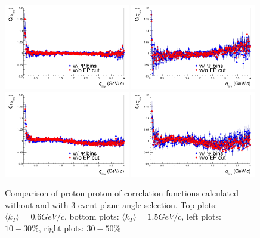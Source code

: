 \begin{figure}%
  \centering
  \includegraphics[width=0.49\textwidth]{cfPPsemicentral_ptdcattcpsipidkT0c2}
  \includegraphics[width=0.49\textwidth]{cfPPsemicentral_ptdcattcpsipidkT0c4}
  \includegraphics[width=0.49\textwidth]{cfPPsemicentral_ptdcattcpsipidkT1c2}
  \includegraphics[width=0.49\textwidth]{cfPPsemicentral_ptdcattcpsipidkT1c4}
  \caption{Comparison of proton-proton of correlation functions calculated without and with 3 event plane angle selection. Top plots: $\langle k_T \rangle = 0.6 GeV/c$, bottom plots: $\langle k_T \rangle = 1.5 GeV/c$, left plots: $10-30 \%$, right plots: $30-50 \%$}
  \label{pppsi3}
\end{figure}
